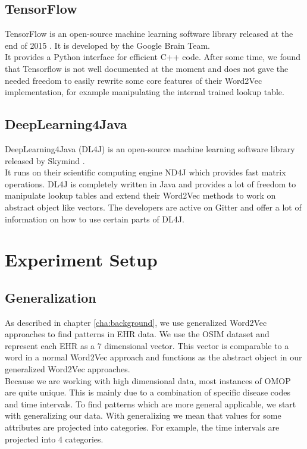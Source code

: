\subsection{TensorFlow}

TensorFlow is an open-source machine learning software library released at the end of 2015 \cite{tensorflow:article}. It is developed by the Google Brain Team. \\
It provides a Python interface for efficient C++ code. After some time, we found that Tensorflow is not well documented at the moment and does not gave the needed freedom to easily rewrite some core features of their Word2Vec implementation, for example manipulating the internal trained lookup table.


\subsection{DeepLearning4Java}

DeepLearning4Java (DL4J) is an open-source machine learning software library released by Skymind \cite{dl4j:article}. \\
It runs on their scientific computing engine ND4J which provides fast matrix operations. DL4J is completely written in Java and provides a lot of freedom to manipulate lookup tables and extend their Word2Vec methods to work on abstract object like vectors. The developers are active on Gitter and offer a lot of information on how to use certain parts of DL4J. 


\section{Experiment Setup}

\subsection{Generalization}

As described in chapter \ref{cha:background}, we use generalized Word2Vec approaches to find patterns in EHR data. We use the OSIM dataset and represent each EHR as a $7$ dimensional vector. This vector is comparable to a word in a normal Word2Vec approach and functions as the abstract object in our generalized Word2Vec approaches. \\

Because we are working with high dimensional data, most instances of OMOP are quite unique. This is mainly due to a combination of specific disease codes and time intervals. To find patterns which are more general applicable, we start with generalizing our data. With generalizing we mean that values for some attributes are projected into categories. For example, the time intervals are projected into $4$ categories. \\

